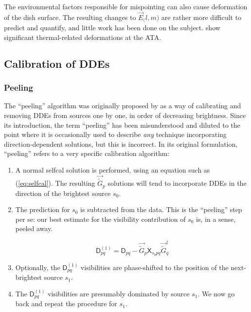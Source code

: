 \documentclass[]{aa}
\newcommand{\jones}[2]{\vec {#1}_{#2}}
\newcommand{\jonesT}[2]{\vec {#1}^\dagger_{#2}}
\newcommand{\coh}[2]{\mathsf{{#1}}_{{#2}}}
\begin{document}
The environmental factors responsible for mispointing can also cause deformation of the dish surface. The resulting changes to $\jones{E}(l,m)$ are rather more difficult to predict and quantify, and little work has been done on the subject. \citet{Harp:ATA-beams} show significant thermal-related deformations at the ATA.

\subsection{Calibration of DDEs\label{sec:cal-DDE}}

\subsubsection{Peeling\label{sec:peeling}}

The ``peeling'' algorithm was originally proposed by \citet{JEN:peeling} as a way of calibrating and removing DDEs from sources one by one, in order of decreasing brightness. Since its introduction, the term ``peeling'' has been misunderstood and diluted to the point where it is occasionally used to describe {\em any} technique incorporating direction-dependent solutions, but this is incorrect. In its original formulation, ``peeling'' refers to a very specific calibration algorithm:

\begin{enumerate}

\item A normal selfcal solution is performed, using an equation such as (\ref{eq:selfcal}). The resulting $\jones{\tilde{G}}{p}$ solutions will tend to incorporate DDEs in the direction of the brightest source $s_0$.

\item The prediction for $s_0$ is subtracted from the data. This is the ``peeling'' step per se: our best estimate for the visibility contribution of $s_0$ is, in a sense, peeled away.

\[
\coh{D}{pq}^{(1)} = \coh{D}{pq} - \jones{\tilde{G}}{p} \coh{X}{s_0 pq} \jonesT{\tilde{G}}{q}
\]

\item Optionally, the $\coh{D}{pq}^{(1)}$ visibilities are phase-shifted to the position of the next-brightest source $s_1$.
 
\item The $\coh{D}{pq}^{(1)}$ visibilities are presumably dominated by source $s_1$. We now go back and repeat the procedure for $s_1$.

\end{enumerate}
\end{document}

